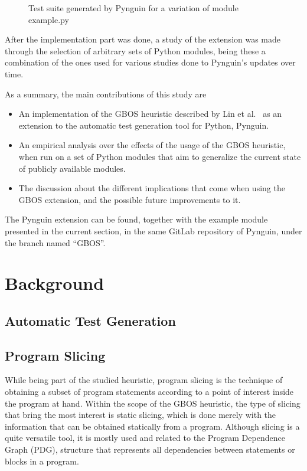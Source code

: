 \documentclass[%
  chapterprefix=false,%
  open=right,%
  twoside=true,%
  paper=a4,%
  logofile={Figures/logo.png},%
  thesistype=master,%
  UKenglish,%
]{se2thesis}
\begin{document}
\begin{figure}
  \inputminted[linenos]{python}{Figures/test2.py}
  \caption{Test suite generated by Pynguin for a variation of module example.py\label{lst:5}}
\end{figure}

After the implementation part was done, a study of the extension was made through the selection of arbitrary sets of Python modules, being these a combination of the ones used for various studies done to Pynguin's updates over time.

As a summary, the main contributions of this study are

\begin{itemize}
  \item An implementation of the GBOS heuristic described by Lin et al.~\cite{DBLP:conf/sigsoft/0001O00D21} as an extension to the automatic test generation tool for Python, Pynguin.
  \item An empirical analysis over the effects of the usage of the GBOS heuristic, when run on a set of Python modules that aim to generalize the current state of publicly available modules.
  \item The discussion about the different implications that come when using the GBOS extension, and the possible future improvements to it.
\end{itemize}

The Pynguin extension can be found, together with the example module presented in the current section, in the same GitLab repository of Pynguin, under the branch named ``GBOS''.

\chapter{Background}\label{chap:background}

\section{Automatic Test Generation}

\newpage

\section{Program Slicing}\label{sec:slicing}

While being part of the studied heuristic, program slicing is the technique of obtaining a subset of program statements according to a point of interest inside the program at hand.
Within the scope of the GBOS heuristic, the type of slicing that bring the most interest is static slicing, which is done merely with the information that can be obtained statically from a program.
Although slicing is a quite versatile tool, it is mostly used and related to the Program Dependence Graph (PDG), structure that represents all dependencies between statements or blocks in a program.
\end{document}
